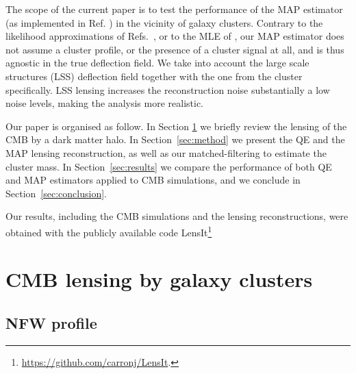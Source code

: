 \documentclass[prd, superscriptaddress, tightenlines, longbibliography, nofootinbib, eqsecnum, amsfonts, amsmath, floatfix, twocolumn, notitlepage]{revtex4-2}
\begin{document}
The scope of the current paper is to test the performance of the MAP estimator (as implemented in Ref. \cite{Carron:2017mqf}) in the vicinity of galaxy clusters.
Contrary to the likelihood approximations of Refs.~\cite{ Yoo:2008bf, Yoo:2010jd}, or to the MLE of \cite{Lewis:2005fq, Baxter:2014frs, Raghunathan:2017cle}, our MAP estimator does not assume a cluster profile, or the presence of a cluster signal at all, and is thus agnostic in the true deflection field. We take into account the large scale structures (LSS) deflection field together with the one from the cluster specifically. LSS lensing increases the reconstruction noise substantially a low noise levels, making the analysis more realistic.

Our paper is organised as follow. In Section \ref{sec:model} we briefly review the lensing of the CMB by a dark matter halo. In Section~\ref{sec:method} we present the QE and the MAP lensing reconstruction, as well as our matched-filtering to estimate the cluster mass. In Section~\ref{sec:results} we compare the performance of both QE and MAP estimators applied to CMB simulations, and we conclude in Section~\ref{sec:conclusion}.

Our results, including the CMB simulations and the lensing reconstructions, were obtained with the publicly available code LensIt\footnote[1]{\url{https://github.com/carronj/LensIt}.}


\section{CMB lensing by galaxy clusters}
\label{sec:model}

\subsection{NFW profile}
\end{document}
